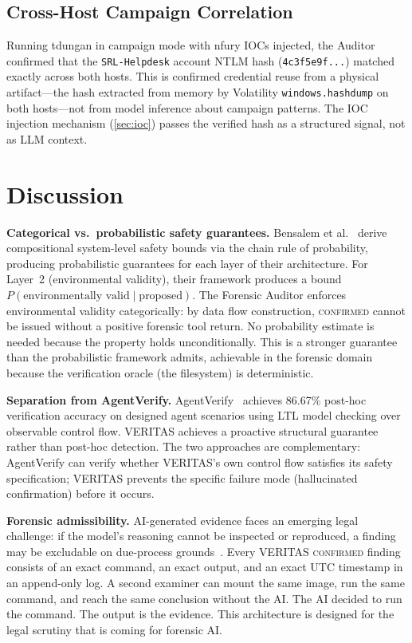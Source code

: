 \documentclass[sigconf, nonacm]{acmart}
\begin{document}
\subsection{Cross-Host Campaign Correlation}

Running tdungan in campaign mode with nfury IOCs injected, the Auditor confirmed
that the \texttt{SRL-Helpdesk} account NTLM hash (\texttt{4c3f5e9f...}) matched
exactly across both hosts. This is confirmed credential reuse from a physical
artifact---the hash extracted from memory by Volatility \texttt{windows.hashdump}
on both hosts---not from model inference about campaign patterns. The IOC
injection mechanism (\cref{sec:ioc}) passes the verified hash as a structured
signal, not as LLM context.

\section{Discussion}
\label{sec:discussion}

\textbf{Categorical vs.\ probabilistic safety guarantees.}
Bensalem et al.~\cite{bensalem2026} derive compositional system-level safety
bounds via the chain rule of probability, producing probabilistic guarantees for
each layer of their architecture. For Layer~2 (environmental validity), their
framework produces a bound $P(\text{environmentally valid} \mid \text{proposed})$.
The Forensic Auditor enforces environmental validity categorically: by data flow
construction, \textsc{confirmed} cannot be issued without a positive forensic
tool return. No probability estimate is needed because the property holds
unconditionally. This is a stronger guarantee than the probabilistic framework
admits, achievable in the forensic domain because the verification oracle
(the filesystem) is deterministic.

\textbf{Separation from AgentVerify.}
AgentVerify~\cite{fang2026} achieves 86.67\% post-hoc verification accuracy on
designed agent scenarios using LTL model checking over observable control flow.
VERITAS achieves a proactive structural guarantee rather than post-hoc detection.
The two approaches are complementary: AgentVerify can verify whether VERITAS's
own control flow satisfies its safety specification; VERITAS prevents the
specific failure mode (hallucinated confirmation) before it occurs.

\textbf{Forensic admissibility.}
AI-generated evidence faces an emerging legal challenge: if the model's reasoning
cannot be inspected or reproduced, a finding may be excludable on
due-process grounds~\cite{aronson2010}. Every VERITAS \textsc{confirmed} finding
consists of an exact command, an exact output, and an exact UTC timestamp in an
append-only log. A second examiner can mount the same image, run the same command,
and reach the same conclusion without the AI. The AI decided to run the command.
The output is the evidence. This architecture is designed for the legal scrutiny
that is coming for forensic AI.
\end{document}
